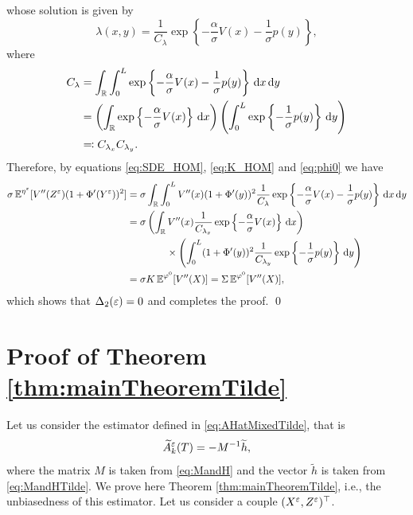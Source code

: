 \documentclass[10pt]{article}
\begin{document}
\begin{appendices}
\begin{equation}
	\end{equation}
	whose solution is given by
	\begin{equation}
	\lambda(x,y) = \frac{1}{C_\lambda} \exp \left\{ - \frac\alpha\sigma V(x) - \frac1\sigma p(y) \right\},
	\end{equation}
	where
	\begin{equation}
	\begin{aligned}
	C_{\lambda} &= \int_{\mathbb{R}} \int_0^L \exp \left\{ - \frac\alpha\sigma V(x) - \frac1\sigma p(y) \right\} \,\mathrm{d} x \,\mathrm{d} y \\
	&= \left( \int_{\mathbb{R}} \exp \left\{ - \frac\alpha\sigma V(x) \right\} \,\mathrm{d} x \right) \left( \int_0^L \exp \left\{ - \frac1\sigma p(y) \right\} \,\mathrm{d} y \right) \\
	&\eqqcolon C_{\lambda_x} C_{\lambda_y}.
	\end{aligned}
	\end{equation}
	Therefore, by equations \eqref{eq:SDE_HOM}, \eqref{eq:K_HOM} and \eqref{eq:phi0} we have
	\begin{equation}
	\begin{aligned}
	\sigma \operatorname{\mathbb{E}}^{\eta^\varepsilon} [V''(Z^\varepsilon) (1 + \Phi'(Y^\varepsilon))^2] &= \sigma \int_{\mathbb{R}} \int_0^L V''(x) (1 + \Phi'(y))^2 \frac{1}{C_\lambda} \exp \left\{ - \frac\alpha\sigma V(x) - \frac1\sigma p(y) \right\} \,\mathrm{d} x \,\mathrm{d} y \\
	&= \sigma \left( \int_{\mathbb{R}} V''(x) \frac{1}{C_{\lambda_x}} \exp \left\{ - \frac\alpha\sigma V(x) \right\} \,\mathrm{d} x \right) \\
	&\qquad \qquad \times \left( \int_0^L (1+\Phi'(y))^2 \frac{1}{C_{\lambda_y}} \exp \left\{ - \frac1\sigma p(y) \right\} \,\mathrm{d} y \right) \\
	&= \sigma K \operatorname{\mathbb{E}}^{\varphi^0}[V''(X)] = \Sigma \operatorname{\mathbb{E}}^{\varphi^0}[V''(X)],
	\end{aligned}
	\end{equation}
	which shows that $\Delta_2(\varepsilon) = 0$ and completes the proof. \qed 


\section{Proof of Theorem \ref{thm:mainTheoremTilde}}\label{ap:EstimatorTilde}
Let us consider the estimator defined in \eqref{eq:AHatMixedTilde}, that is
\begin{equation}
	\widetilde A^\varepsilon_k(T) = -M^{-1}\widetilde h,
\end{equation}
where the matrix $M$ is taken from \eqref{eq:MandH} and the vector $\widetilde{h}$ is taken from \eqref{eq:MandHTilde}. We prove here Theorem \ref{thm:mainTheoremTilde}, i.e., the unbiasedness of this estimator. Let us consider a couple $(X^\varepsilon, Z^\varepsilon)^\top$. 


\end{appendices}
\end{document}
